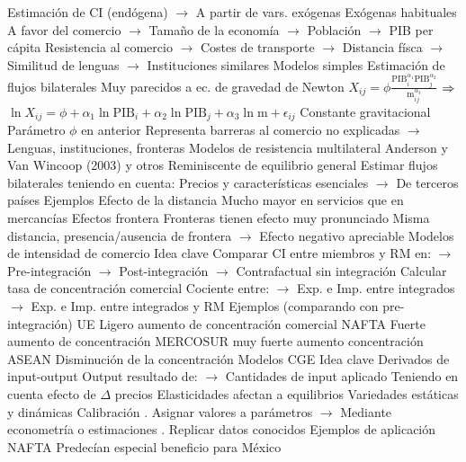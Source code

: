 \documentclass{nuevotema}
\begin{document}
\begin{esquemal}
				\4[] Estimación de CI (endógena)
				\4[] $\to$ A partir de vars. exógenas
				\4 Exógenas habituales
				\4[] A favor del comercio
				\4[] $\to$ Tamaño de la economía
				\4[] $\to$ Población
				\4[] $\to$ PIB per cápita
				\4[] Resistencia al comercio
				\4[] $\to$ Costes de transporte
				\4[] $\to$ Distancia físca
				\4[] $\to$ Similitud de lenguas
				\4[] $\to$ Instituciones similares
			\3 Modelos simples
				\4 Estimación de flujos bilaterales
				\4 Muy parecidos a ec. de gravedad de Newton
				\4[] $X_{ij} = \phi \frac{\text{PIB}_i^{\alpha_1} \text{PIB}_j^{\alpha_2}}{\text{m}_{ij}^{\alpha_3}}$
				\4[] $\Rightarrow$ $\ln X_{ij} = \phi + \alpha_1 \ln \text{PIB}_i + \alpha_2 \ln \text{PIB}_j + \alpha_3 \ln \text{m} + \epsilon_{ij}$
				\4 Constante gravitacional
				\4[] Parámetro $\phi$ en anterior
				\4[] Representa barreras al comercio no explicadas
				\4[] $\to$ Lenguas, instituciones, fronteras
			\3 Modelos de resistencia multilateral
				\4 Anderson y Van Wincoop (2003) y otros
				\4 Reminiscente de equilibrio general
				\4 Estimar flujos bilaterales teniendo en cuenta:
				\4[] Precios y características esenciales
				\4[] $\to$ De terceros países
			\3 Ejemplos
				\4 Efecto de la distancia
				\4[] Mucho mayor en servicios que en mercancías
				\4 Efectos frontera
				\4[] Fronteras tienen efecto muy pronunciado
				\4[] Misma distancia, presencia/ausencia de frontera
				\4[] $\to$ Efecto negativo apreciable
		\2 Modelos de intensidad de comercio
			\3 Idea clave
				\4 Comparar CI entre miembros y RM en:
				\4[] $\to$ Pre-integración
				\4[] $\to$ Post-integración
				\4[] $\to$ Contrafactual sin integración
				\4 Calcular tasa de concentración comercial
				\4[] Cociente entre:
				\4[] $\to$ Exp. e Imp. entre integrados
				\4[] $\to$ Exp. e Imp. entre integrados y RM
			\3 Ejemplos (comparando con pre-integración)
				\4 UE
				\4[] Ligero aumento de concentración comercial
				\4 NAFTA
				\4[] Fuerte aumento de concentración
				\4 MERCOSUR
				\4[] muy fuerte aumento concentración
				\4 ASEAN
				\4[] Disminución de la concentración
		\2 Modelos CGE
			\3 Idea clave
				\4 Derivados de input-output
				\4[] Output resultado de:
				\4[] $\to$ Cantidades de input aplicado
				\4 Teniendo en cuenta efecto de $\Delta$ precios
				\4[] Elasticidades afectan a equilibrios
				\4 Variedades estáticas y dinámicas
				\4 Calibración
				. Asignar valores a parámetros
				\4[] $\to$ Mediante econometría o estimaciones
				. Replicar datos conocidos
			\3 Ejemplos de aplicación
				\4 NAFTA
				\4[] Predecían especial beneficio para México

\end{esquemal}
\end{document}
